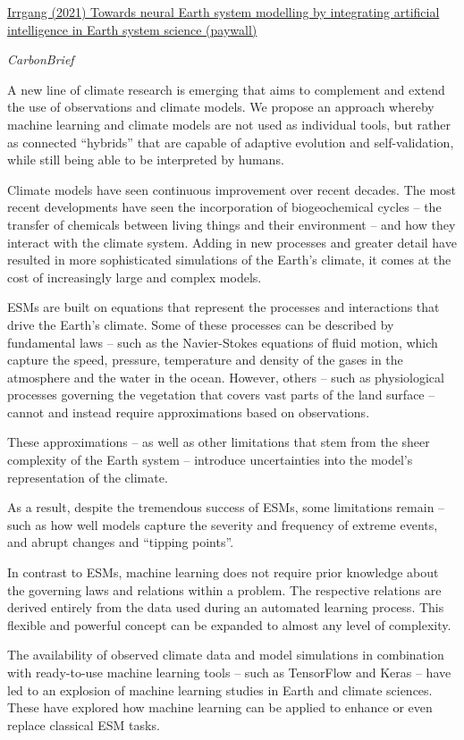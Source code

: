 \documentclass[
]{book}
\begin{document}
\href{https://www.nature.com/articles/s42256-021-00374-3}{Irrgang (2021) Towards neural Earth system modelling by integrating artificial intelligence in Earth system science (paywall)}

\emph{CarbonBrief}

A new line of climate research is emerging that aims to complement and extend the use of observations and climate models.
We propose an approach whereby machine learning and climate models are not used as individual tools, but rather as connected ``hybrids'' that are capable of adaptive evolution and self-validation, while still being able to be interpreted by humans.

Climate models have seen continuous improvement over recent decades. The most recent developments have seen the incorporation of biogeochemical cycles -- the transfer of chemicals between living things and their environment -- and how they interact with the climate system.
Adding in new processes and greater detail have resulted in more sophisticated simulations of the Earth's climate, it comes at the cost of increasingly large and complex models.

ESMs are built on equations that represent the processes and interactions that drive the Earth's climate. Some of these processes can be described by fundamental laws -- such as the Navier-Stokes equations of fluid motion, which capture the speed, pressure, temperature and density of the gases in the atmosphere and the water in the ocean. However, others -- such as physiological processes governing the vegetation that covers vast parts of the land surface -- cannot and instead require approximations based on observations.

These approximations -- as well as other limitations that stem from the sheer complexity of the Earth system -- introduce uncertainties into the model's representation of the climate.

As a result, despite the tremendous success of ESMs, some limitations remain -- such as how well models capture the severity and frequency of extreme events, and abrupt changes and ``tipping points''.

In contrast to ESMs, machine learning does not require prior knowledge about the governing laws and relations within a problem. The respective relations are derived entirely from the data used during an automated learning process. This flexible and powerful concept can be expanded to almost any level of complexity.

The availability of observed climate data and model simulations in combination with ready-to-use machine learning tools -- such as TensorFlow and Keras -- have led to an explosion of machine learning studies in Earth and climate sciences. These have explored how machine learning can be applied to enhance or even replace classical ESM tasks.
\end{document}
